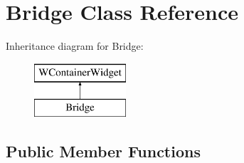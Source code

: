 \hypertarget{class_bridge}{}\section{Bridge Class Reference}
\label{class_bridge}
Inheritance diagram for Bridge\+:\begin{figure}[H]
\begin{center}
\leavevmode
\includegraphics[height=2.000000cm]{class_bridge}
\end{center}
\end{figure}
\subsection*{Public Member Functions}

